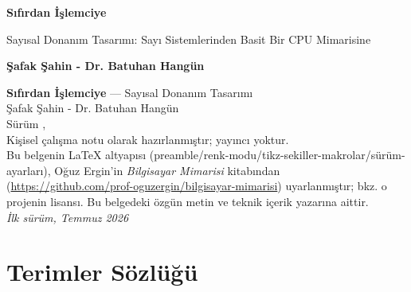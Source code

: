 \documentclass[12pt, a4paper, twoside, openright]{book}
\begin{document}
\frontmatter


\thispagestyle{empty}
\begin{center}
\vspace*{4cm}
{\Huge\bfseries Sıfırdan İşlemciye\par}
\vspace{16pt}
{\Large Sayısal Donanım Tasarımı: Sayı Sistemlerinden Basit Bir CPU Mimarisine\par}
\vspace{24pt}
{\large\bfseries Şafak Şahin - Dr. Batuhan Hangün\par}
\end{center}

\clearpage
\thispagestyle{empty}
\vspace*{\fill}
\noindent
{\small
\textbf{Sıfırdan İşlemciye} --- Sayısal Donanım Tasarımı\\[3pt]
Şafak Şahin - Dr. Batuhan Hangün\\[6pt]
Sürüm \kitapsurum, \the\year\\[6pt]
Kişisel çalışma notu olarak hazırlanmıştır; yayıncı yoktur.\\[6pt]
Bu belgenin LaTeX altyapısı (preamble/renk-modu/tikz-sekiller-makrolar/sürüm-ayarları),
Oğuz Ergin'in \emph{Bilgisayar Mimarisi} kitabından (\url{https://github.com/prof-oguzergin/bilgisayar-mimarisi})
uyarlanmıştır; bkz. o projenin lisansı. Bu belgedeki özgün metin ve teknik içerik yazarına aittir.\\[6pt]
\textit{İlk sürüm, Temmuz 2026}
}
\vspace{2cm}
\cleardoublepage

\tableofcontents
\cleardoublepage
\listoffigures
{}
\cleardoublepage
\listoftables
{}
\cleardoublepage
\listofbilginotlari
\cleardoublepage
\listofdetaybilgiler

\mainmatter


\backmatter

\chapter*{Terimler Sözlüğü}


\printbibliography[title={Kaynakça}]

\printindex
\end{document}
